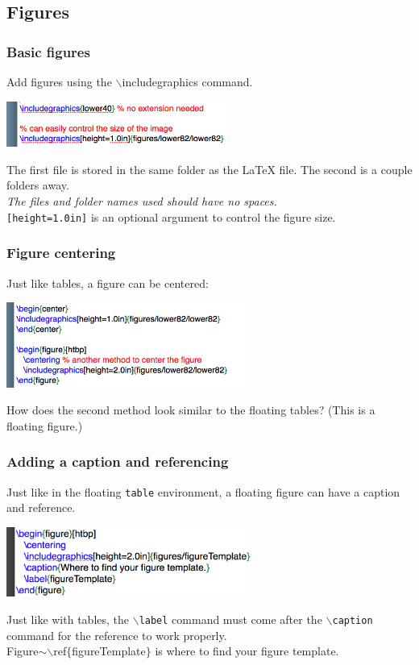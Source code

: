 \documentclass[slidestop,compress,mathserif]{beamer}
\begin{document}
\subsection[Figures]{Figures}
\begin{frame} \frametitle{Basic figures}
	Add figures using the {\color{command}$\backslash$includegraphics} command.
	\begin{center}
	\includegraphics[height=15mm]{basicsOfLatex/figures/basicFigures}
	\end{center}
	The first file is stored in the same folder as the LaTeX file. The second is a couple folders away.
	\vspace{0.5cm} \\
	\emph{The files and folder names used should have no spaces.}
	\vspace{0.5cm} \\
	\texttt{[height=1.0in]} is an optional argument to control the figure size.
\end{frame}

\begin{frame} \frametitle{Figure centering}
	Just like tables, a figure can be centered:
	\begin{center}
	\includegraphics[height=1.1in]{basicsOfLatex/figures/centerFigure}
	\end{center}
	How does the second method look similar to the floating tables? (This is a floating figure.)
\end{frame}

\begin{frame} \frametitle{Adding a caption and referencing}
	Just like in the floating \texttt{\color{highlight}table} environment, a floating figure can have a caption and reference.
	\begin{center}
	\includegraphics[height=0.9in]{basicsOfLatex/figures/figureWithCaptionLabel}
	\end{center}
	Just like with tables, the \texttt{\color{command}$\backslash$label} command must come after the \texttt{\color{command}$\backslash$caption} command for the reference to work properly.
	\vspace{5mm} \\
	Figure$\sim${\color{command}$\backslash$ref}{\color{braces}$\{${\color{black}figureTemplate}$\}$} is where to find your figure template.
\end{frame}
\end{document}
